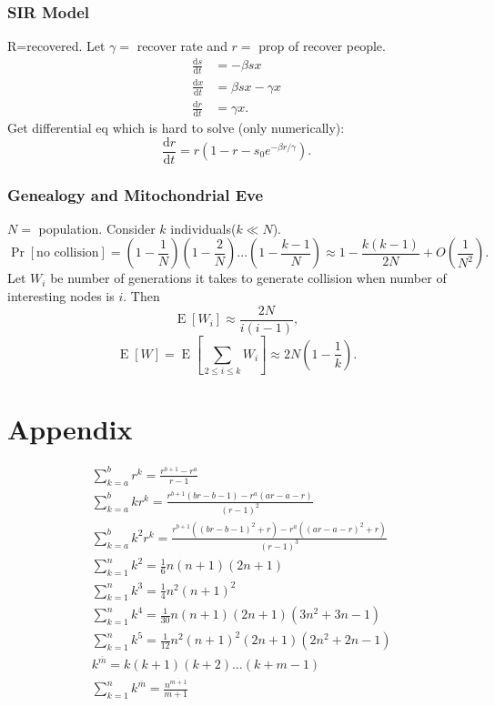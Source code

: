 \documentclass[a4paper,twocolumn,10pt]{article}
\newcommand{\pte}[1]{\left({#1}\right)}
\newcommand{\E}{\operatorname{E}}
\newcommand{\dd}{\mathrm{d}}
\begin{document}
	\subsubsection{SIR Model}
		R=recovered. Let $\gamma=$ recover rate and $r=$ prop of recover people.
		\[ \begin{split}
			\frac{\dd s}{\dd t} &= -\beta s x \\
			\frac{\dd x}{\dd t} &= \beta s x - \gamma x \\
			\frac{\dd r}{\dd t} &= \gamma x.
		\end{split} \]
		Get differential eq which is hard to solve (only numerically):
		\[
			\frac{\dd r}{\dd t} =
				r\pte{1-r-s_0 e^{-\beta r/\gamma}}.
		\]

	\subsubsection{Genealogy and Mitochondrial Eve}
		$N=$ population. Consider $k$ individuals($k\ll N$).
		\[
		\Pr[\textrm{no collision}] = \pte{1-\frac{1}{N}} \pte{1-\frac{2}{N}}
		... \pte{1-\frac{k-1}{N}} \approx 1 - \frac{k(k-1)}{2N} + O\pte{\frac{1}{N^2}}.
		\]
		Let $W_i$ be number of generations it takes to generate collision when
			number of interesting nodes is $i$.
		Then
		\[
			\E[W_i]\approx \frac{2N}{i(i-1)},
		\]
		\[
			\E[W]=\E\left[\sum_{2\le i\le k} W_i\right]\approx 2N\pte{1-\frac{1}{k}}.
		\]
		
\section{Appendix}
\begin{align*}
        &\sum_{k=a}^br^k=\frac{r^{b+1}-r^a}{r-1}\\
        &\sum_{k=a}^bkr^k=\frac{r^{b+1}(br-b-1)-r^a(ar-a-r)}{(r-1)^2}\\
        &\sum_{k=a}^bk^2r^k=\frac{r^{b+1}((br-b-1)^2+r)-r^a((ar-a-r)^2+r)}{(r-1)^3}\\
        &\sum_{k=1}^nk^2=\frac{1}{6}n(n+1)(2n+1)\\
        &\sum_{k=1}^nk^3=\frac{1}{4}n^2(n+1)^2\\
        &\sum_{k=1}^nk^4=\frac{1}{30}n(n+1)(2n+1)(3n^2+3n-1)\\
        &\sum_{k=1}^nk^5=\frac{1}{12}n^2(n+1)^2(2n+1)(2n^2+2n-1)\\
        &k^{\overline{m}}=k(k+1)(k+2)\dots(k+m-1)\\
        &\sum_{k=1}^nk^{\overline{m}}=\frac{n^{\overline{m+1}}}{m+1}\\
\end{align*}
\end{document}
